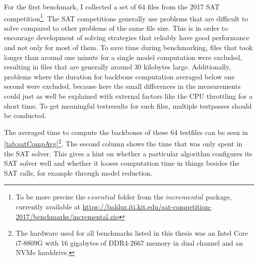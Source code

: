 For the first benchmark, I collected a set of 64 files from the 2017 SAT competition\footnote{
To be more precise the $essential$ folder from the $incremental$ package, currently available at \url{https://baldur.iti.kit.edu/sat-competition-2017/benchmarks/incremental.zip}
}. The SAT competitions generally use problems that are difficult to solve compared to other problems of the same file size. This is in order to encourage development of solving strategies that reliably have good performance and not only for most of them. To save time during benchmarking, files that took longer than around one minute for a single model computation were excluded, resulting in files that are generally around 30 kilobytes large. Additionally, problems where the duration for backbone computation averaged below one second were excluded, because here the small differences in the measurements could just as well be explained with external factors like the CPU throttling for a short time. To get meaningful testresults for such files, multiple testpasses should be conducted.

The averaged time to compute the backbones of these 64 testfiles can be seen in \ref{tab:satCompAvg}\footnote{
	The hardware used for all benchmarks listed in this thesis was an Intel Core i7-8809G with 16 gigabytes of DDR4-2667 memory in dual channel and an NVMe harddrive. 
}. The second column shows the time that was only spent in the SAT solver. This gives a hint on whether a particular algorithm configures its SAT solver well and whether it looses computation time in things besides the SAT calls, for example through model reduction.

